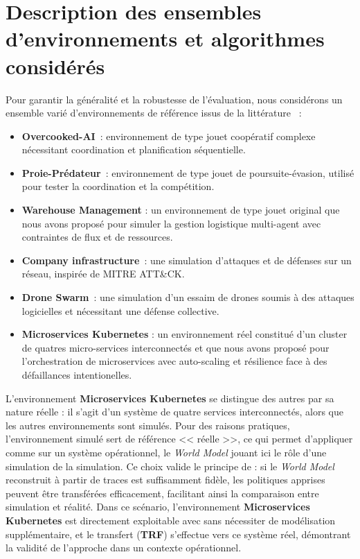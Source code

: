 \section{Description des ensembles d'environnements et algorithmes considérés}

Pour garantir la généralité et la robustesse de l’évaluation, nous considérons un ensemble varié d’environnements de référence issus de la littérature ~:
\begin{itemize}
    \item \textbf{Overcooked-AI}~\cite{overcookedai}: environnement de type jouet coopératif complexe nécessitant coordination et planification séquentielle.
    \item \textbf{Proie-Prédateur}~\cite{lowe2017multi}: environnement  de type jouet de poursuite-évasion, utilisé pour tester la coordination et la compétition.
    \item \textbf{Warehouse Management} : un environnement  de type jouet original que nous avons proposé pour simuler la gestion logistique multi-agent avec contraintes de flux et de ressources.
    \item \textbf{Company infrastructure}~\cite{cyberbattlesim}: une simulation d’attaques et de défenses sur un réseau, inspirée de MITRE ATT\&CK.
    \item \textbf{Drone Swarm}~\cite{cage_challenge_3_announcement}: une simulation d'un essaim de drones soumis à des attaques logicielles et nécessitant une défense collective.
    \item \textbf{Microservices Kubernetes} : un environnement réel constitué d'un cluster de quatres micro-services interconnectés et que nous avons proposé pour l'orchestration de microservices avec auto-scaling et résilience face à des défaillances intentionelles.
\end{itemize}

L’environnement \textbf{Microservices Kubernetes} se distingue des autres par sa nature réelle : il s’agit d’un système de quatre services interconnectés, alors que les autres environnements sont simulés. Pour des raisons pratiques, l’environnement simulé sert de référence << réelle >>, ce qui permet d’appliquer  comme sur un système opérationnel, le \textit{World Model} jouant ici le rôle d’une simulation de la simulation. Ce choix valide le principe de  : si le \textit{World Model} reconstruit à partir de traces est suffisamment fidèle, les politiques apprises peuvent être transférées efficacement, facilitant ainsi la comparaison entre simulation et réalité. Dans ce scénario, l’environnement \textbf{Microservices Kubernetes} est directement exploitable avec  sans nécessiter de modélisation supplémentaire, et le transfert (\textbf{TRF}) s’effectue vers ce système réel, démontrant la validité de l’approche dans un contexte opérationnel.

